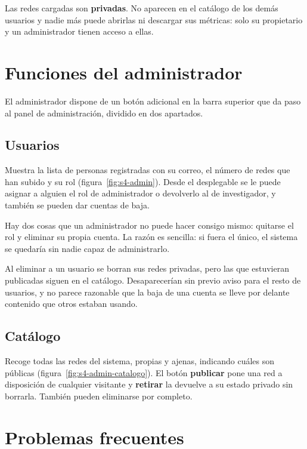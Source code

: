 Las redes cargadas son \textbf{privadas}. No aparecen en el catálogo de los demás usuarios y nadie
más puede abrirlas ni descargar sus métricas: solo su propietario y un administrador tienen acceso
a ellas.

\section{Funciones del administrador}

El administrador dispone de un botón adicional en la barra superior que da paso al panel de
administración, dividido en dos apartados.

\subsection{Usuarios}

Muestra la lista de personas registradas con su correo, el número de redes que han subido y su rol
(figura~\ref{fig:s4-admin}). Desde el desplegable se le puede asignar a alguien el rol de
administrador o devolverlo al de investigador, y también se pueden dar cuentas de baja.

Hay dos cosas que un administrador no puede hacer consigo mismo: quitarse el rol y eliminar su propia
cuenta. La razón es sencilla: si fuera el único, el sistema se quedaría sin nadie capaz de
administrarlo.

Al eliminar a un usuario se borran sus redes privadas, pero las que estuvieran publicadas siguen en
el catálogo. Desaparecerían sin previo aviso para el resto de usuarios, y no parece razonable que la
baja de una cuenta se lleve por delante contenido que otros estaban usando.

\subsection{Catálogo}

Recoge todas las redes del sistema, propias y ajenas, indicando cuáles son públicas
(figura~\ref{fig:s4-admin-catalogo}). El botón \textbf{publicar} pone una red a disposición de
cualquier visitante y \textbf{retirar} la devuelve a su estado privado sin borrarla. También pueden
eliminarse por completo.

\section{Problemas frecuentes}

